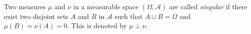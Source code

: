\documentclass[12pt]{article}
\begin{document}
Two measures $\mu$ and $\nu$ in a measurable space $(\Omega,\mathcal{A})$ are
called \emph{singular} if there exist two disjoint sets $A$ and $B$ in $\mathcal{A}$ such that $A\cup B =\Omega$ and $\mu(B)=\nu(A) = 0$.
This is denoted by $\mu\perp\nu$.
\end{document}
